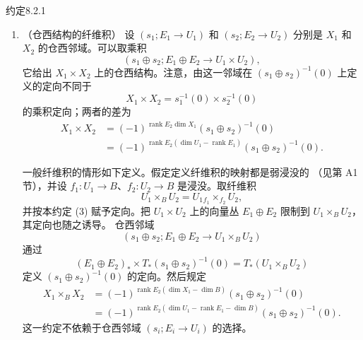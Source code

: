 \begin{statement}{约定}{8.2.1}
\begin{enumerate}[label=(\arabic*),leftmargin=2.8em]
换言之，先把向量空间
$T_{[p_1,p_2]}(X_1\times_YX_2)$ 识别为
\[
 \ker(df_1)_{p_1}\times T_qY\times\ker(df_2)_{p_2},
\]
再规定其定向，使这一识别为定向向量空间的同构。这里
$\ker(df_i)_{p_i}$ 的定向由下列定向同构分别规定：
\begin{align}
 T_{p_1}X_1
 &\cong\ker(df_1)_{p_1}\times\operatorname{Im}(df_1)_{p_1},
 \tag{8.2.1.3}\label{eq:8-2-1-3}\\
 T_{p_2}X_2
 &\cong\operatorname{Im}(df_2)_{p_2}\times\ker(df_2)_{p_2}.
 \tag{8.2.1.4}\label{eq:8-2-1-4}
\end{align}
其中 $\operatorname{Im}(df_i)_{p_i}$ 与 $T_qY$ 作为定向向量空间同构。
当 $(df_i)_{p_i}$（$i=1,2$）为双射时，我们用 $\epsilon_i$ 给单点集
$\ker(df_i)_{p_i}$ 定向，并由此记录定向同构：
若 $(df_i)_{p_i}$ 是保定向同构，则
$\epsilon_i=+1$；若它是反定向同构，则 $\epsilon_i=-1$。

按照这种写法，今后讨论纤维积定向时，将把定向同构
\eqref{eq:8-2-1-3}--\eqref{eq:8-2-1-4} 简写为
\begin{align}
 X_1&=X_1^\circ\times Y,
 \tag{8.2.1.5}\label{eq:8-2-1-5}\\
 X_2&=Y\times{}^\circ X_2.
 \tag{8.2.1.6}\label{eq:8-2-1-6}
\end{align}
相应地，把纤维积 $X_1\times_YX_2$ 写成
$X_1^\circ\times Y\times{}^\circ X_2$。当然，这些等式是在切空间层次
成立的等式。

\item \textup{（仓西结构的纤维积）}
设 $(s_1;E_1\to U_1)$ 和 $(s_2;E_2\to U_2)$ 分别是
$X_1$ 和 $X_2$ 的仓西邻域。可以取乘积
\[
 (s_1\oplus s_2;E_1\oplus E_2\longrightarrow U_1\times U_2),
\]
它给出 $X_1\times X_2$ 上的仓西结构。注意，由这一邻域在
$(s_1\oplus s_2)^{-1}(0)$ 上定义的定向不同于
\[
 X_1\times X_2=s_1^{-1}(0)\times s_2^{-1}(0)
\]
的乘积定向；两者的差为
\[
\begin{aligned}
 X_1\times X_2
 &=(-1)^{\operatorname{rank}E_2\dim X_1}
   (s_1\oplus s_2)^{-1}(0)\\
 &=(-1)^{\operatorname{rank}E_2(\dim U_1-\operatorname{rank}E_1)}
   (s_1\oplus s_2)^{-1}(0).
\end{aligned}
\]

一般纤维积的情形如下定义。假定定义纤维积的映射都是弱浸没的
（见第 A1 节），并设
$f_1\colon U_1\to B$、$f_2\colon U_2\to B$ 是浸没。取纤维积
\[
 U_1\times_BU_2=U_1{}_{f_1}\!\times_{f_2}U_2,
\]
并按本约定 (3) 赋予定向。把 $U_1\times U_2$ 上的向量丛
$E_1\oplus E_2$ 限制到 $U_1\times_BU_2$，其定向也随之诱导。
仓西邻域
\[
 (s_1\oplus s_2;E_1\oplus E_2\longrightarrow U_1\times_BU_2)
\]
通过
\[
 (E_1\oplus E_2)_*\times
 T_*(s_1\oplus s_2)^{-1}(0)=T_*(U_1\times_BU_2)
\]
定义 $(s_1\oplus s_2)^{-1}(0)$ 的定向。然后规定
\[
\begin{aligned}
 X_1\times_BX_2
 &=(-1)^{\operatorname{rank}E_2(\dim X_1-\dim B)}
   (s_1\oplus s_2)^{-1}(0)\\
 &=(-1)^{\operatorname{rank}E_2
   (\dim U_1-\operatorname{rank}E_1-\dim B)}
   (s_1\oplus s_2)^{-1}(0).
\end{aligned}
\]
这一约定不依赖于仓西邻域 $(s_i;E_i\to U_i)$ 的选择。
\end{enumerate}
\end{statement}

